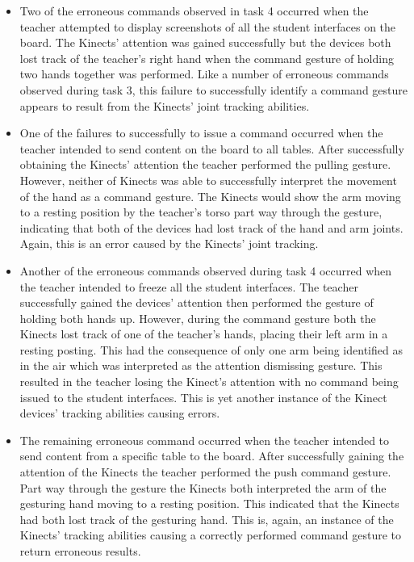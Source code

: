 \documentclass[link]{IWCOMP}
\begin{document}
\begin{itemize}
\item Two of the erroneous commands observed in task 4 occurred when the teacher attempted to display screenshots of all the student interfaces on the board.
The Kinects' attention was gained successfully but the devices both lost track of the teacher's right hand when the command gesture of holding two hands together was performed.
Like a number of erroneous commands observed during task 3, this failure to successfully identify a command gesture appears to result from the Kinects' joint tracking abilities.

\item One of the failures to successfully to issue a command occurred when the teacher intended to send content on the board to all tables.
After successfully obtaining the Kinects' attention the teacher performed the pulling gesture.
However, neither of Kinects was able to successfully interpret the movement of the hand as a command gesture.
The Kinects would show the arm moving to a resting position by the teacher's torso part way through the gesture, indicating that both of the devices had lost track of the hand and arm joints.
Again, this is an error caused by the Kinects' joint tracking.

\item Another of the erroneous commands observed during task 4 occurred when the teacher intended to freeze all the student interfaces.
The teacher successfully gained the devices' attention then performed the gesture of holding both hands up.
However, during the command gesture both the Kinects lost track of one of the teacher's hands, placing their left arm in a resting posting.
This had the consequence of only one arm being identified as in the air which was interpreted as the attention dismissing gesture.
This resulted in the teacher losing the Kinect's attention with no command being issued to the student interfaces.
This is yet another instance of the Kinect devices' tracking abilities causing errors.

\item The remaining erroneous command occurred when the teacher intended to send content from a specific table to the board.
After successfully gaining the attention of the Kinects the teacher performed the push command gesture.
Part way through the gesture the Kinects both interpreted the arm of the gesturing hand moving to a resting position.
This indicated that the Kinects had both lost track of the gesturing hand.
This is, again, an instance of the Kinects' tracking abilities causing a correctly performed command gesture to return erroneous results.
\end{itemize}
\end{document}
